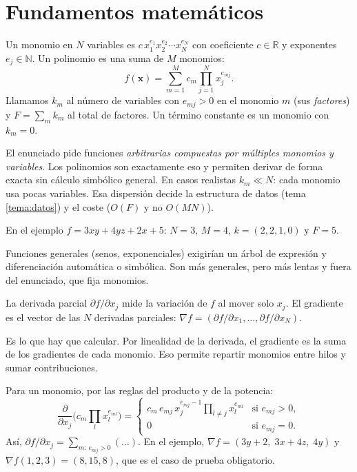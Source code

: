 \section{Fundamentos matemáticos}\label{tema:mat}

\que Un monomio en $N$ variables es $c\,x_1^{e_1}x_2^{e_2}\cdots x_N^{e_N}$ con coeficiente $c\in\mathbb{R}$ y exponentes $e_j\in\mathbb{N}$. Un polinomio es una suma de $M$ monomios:
\[
f(\mathbf{x})=\sum_{m=1}^{M} c_m \prod_{j=1}^{N} x_j^{e_{mj}} .
\]
Llamamos $k_m$ al número de variables con $e_{mj}>0$ en el monomio $m$ (sus \emph{factores}) y $F=\sum_m k_m$ al total de factores. Un término constante es un monomio con $k_m=0$.

\porque El enunciado pide funciones \emph{arbitrarias compuestas por múltiples monomios y variables}. Los polinomios son exactamente eso y permiten derivar de forma exacta sin cálculo simbólico general. En casos realistas $k_m\ll N$: cada monomio usa pocas variables. Esa dispersión decide la estructura de datos (tema \ref{tema:datos}) y el coste ($O(F)$ y no $O(MN)$).

\como En el ejemplo $f=3xy+4yz+2x+5$: $N=3$, $M=4$, $k=(2,2,1,0)$ y $F=5$.

\alt Funciones generales (senos, exponenciales) exigirían un árbol de expresión y diferenciación automática o simbólica. Son más generales, pero más lentas y fuera del enunciado, que fija monomios.

\que La derivada parcial $\partial f/\partial x_j$ mide la variación de $f$ al mover solo $x_j$. El gradiente es el vector de las $N$ derivadas parciales: $\nabla f=(\partial f/\partial x_1,\dots,\partial f/\partial x_N)$.

\porque Es lo que hay que calcular. Por linealidad de la derivada, el gradiente es la suma de los gradientes de cada monomio. Eso permite repartir monomios entre hilos y sumar contribuciones.

\como Para un monomio, por las reglas del producto y de la potencia:
\[
\frac{\partial}{\partial x_j}\Big(c_m\prod_{l} x_l^{e_{ml}}\Big)=
\begin{cases}
c_m\, e_{mj}\, x_j^{e_{mj}-1}\prod_{l\neq j} x_l^{e_{ml}} & \text{si } e_{mj}>0,\\
0 & \text{si } e_{mj}=0.
\end{cases}
\]
Así, $\partial f/\partial x_j=\sum_{m:\,e_{mj}>0}(\dots)$. En el ejemplo, $\nabla f=(3y+2,\;3x+4z,\;4y)$ y $\nabla f(1,2,3)=(8,15,8)$, que es el caso de prueba obligatorio.

